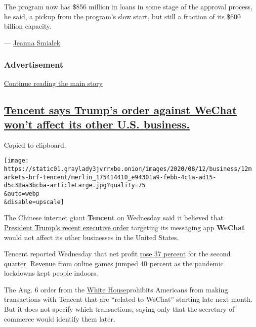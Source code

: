 The program now has \$856 million in loans in some stage of the approval
process, he said, a pickup from the program's slow start, but still a
fraction of its \$600 billion capacity.

--- \href{https://www.nytimes3xbfgragh.onion/by/jeanna-smialek}{Jeanna
Smialek}

\hypertarget{advertisement-1}{%
\subsubsection{Advertisement}\label{advertisement-1}}

\protect\hyperlink{after-dfp-ad-mid2}{Continue reading the main story}

\hypertarget{tencent-says-trumps-order-against-wechat-wont-affect-its-other-us-business}{%
\subsection{\texorpdfstring{\protect\hyperlink{tencent-says-trumps-order-against-wechat-wont-affect-its-other-us-business}{Tencent
says Trump's order against WeChat won't affect its other U.S.
business.}}{Tencent says Trump's order against WeChat won't affect its other U.S. business.}}\label{tencent-says-trumps-order-against-wechat-wont-affect-its-other-us-business}}

Copied to clipboard.

\texttt{[image: https://static01.graylady3jvrrxbe.onion/images/2020/08/12/business/12markets-brf-tencent/merlin\_175414410\_e94301a9-febb-4c1a-ad15-d5c38aa3bcba-articleLarge.jpg?quality=75\\\&auto=webp\\\&disable=upscale]}

The Chinese internet giant \textbf{Tencent} on Wednesday said it
believed that
\href{https://www.nytimes3xbfgragh.onion/2020/08/07/business/economy/trump-executive-order-tiktok-wechat.html}{President
Trump's recent executive order} targeting its messaging app
\textbf{WeChat} would not affect its other businesses in the United
States.

Tencent reported Wednesday that net profit
\href{https://cdc-tencent-com-1258344706.image.myqcloud.com/uploads/2020/08/12/00e999c23314aa085c0b48c533d4d393.pdf}{rose
37 percent} for the second quarter. Revenue from online games jumped 40
percent as the pandemic lockdowns kept people indoors.

The Aug. 6 order from the
\href{https://www.nytimes3xbfgragh.onion/2020/08/06/technology/trump-wechat-tiktok-china.html}{White
House}prohibits Americans from making transactions with Tencent that are
``related to WeChat'' starting late next month. But it does not specify
which transactions, saying only that the secretary of commerce would
identify them later.

